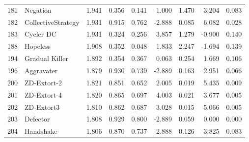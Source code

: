 \begin{tabular}{rlrrrrrrr}
  181 &               Negation &           1.941 &       0.356 &  0.141 &         -1.000 &     1.470 &    -3.204 &    0.083 \\
  182 &     CollectiveStrategy &           1.931 &       0.915 &  0.762 &         -2.888 &     0.085 &     6.082 &    0.028 \\
  183 &              Cycler DC &           1.931 &       0.324 &  0.256 &          3.857 &     1.279 &    -0.900 &    0.140 \\
  188 &               Hopeless &           1.908 &       0.352 &  0.048 &          1.833 &     2.247 &    -1.694 &    0.139 \\
  194 &         Gradual Killer &           1.892 &       0.354 &  0.367 &          0.063 &     0.254 &     1.669 &    0.106 \\
  196 &             Aggravater &           1.879 &       0.930 &  0.739 &         -2.889 &     0.163 &     2.951 &    0.066 \\
  200 &            ZD-Extort-2 &           1.821 &       0.851 &  0.652 &          2.005 &     0.019 &     5.435 &    0.009 \\
  201 &            ZD-Extort-4 &           1.820 &       0.865 &  0.697 &          4.003 &     0.021 &     3.677 &    0.005 \\
  202 &             ZD-Extort3 &           1.810 &       0.862 &  0.687 &          3.028 &     0.015 &     5.066 &    0.005 \\
  203 &               Defector &           1.808 &       0.929 &  0.800 &         -2.889 &     0.059 &     0.000 &    0.000 \\
  204 &              Handshake &           1.806 &       0.870 &  0.737 &         -2.888 &     0.126 &     3.825 &    0.083 \\
\bottomrule
\end{tabular}
